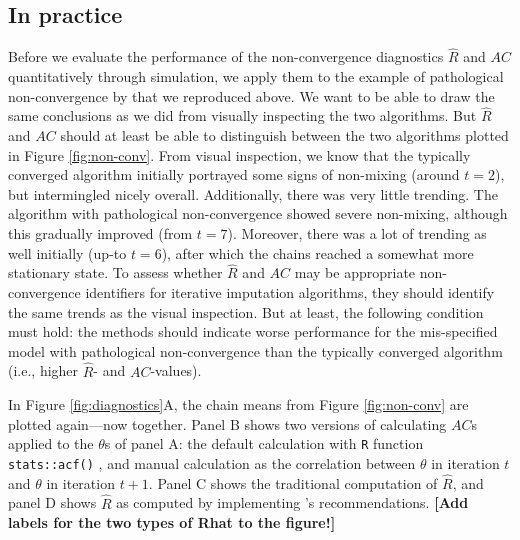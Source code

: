 \documentclass[Royal,times,sageh]{sagej}
\begin{document}
\hypertarget{in-practice}{%
\subsection{In practice}\label{in-practice}}

Before we evaluate the performance of the non-convergence diagnostics \(\widehat{R}\) and \(AC\) quantitatively through simulation, we apply them to the example of pathological non-convergence by \citet{buur18} that we reproduced above. We want to be able to draw the same conclusions as we did from visually inspecting the two algorithms. But \(\widehat{R}\) and \(AC\) should at least be able to distinguish between the two algorithms plotted in Figure \ref{fig:non-conv}. From visual inspection, we know that the typically converged algorithm initially portrayed some signs of non-mixing (around \(t=2\)), but intermingled nicely overall. Additionally, there was very little trending. The algorithm with pathological non-convergence showed severe non-mixing, although this gradually improved (from \(t=7\)). Moreover, there was a lot of trending as well initially (up-to \(t=6\)), after which the chains reached a somewhat more stationary state. To assess whether \(\widehat{R}\) and \(AC\) may be appropriate non-convergence identifiers for iterative imputation algorithms, they should identify the same trends as the visual inspection. But at least, the following condition must hold: the methods should indicate worse performance for the mis-specified model with pathological non-convergence than the typically converged algorithm (i.e., higher \(\widehat{R}\)- and \(AC\)-values).

In Figure \ref{fig:diagnostics}A, the chain means from Figure \ref{fig:non-conv} are plotted again---now together. Panel B shows two versions of calculating \(AC\)s applied to the \(\theta\)s of panel A: the default calculation with \texttt{R} function \texttt{stats::acf()} \citep{R}, and manual calculation as the correlation between \(\theta\) in iteration \(t\) and \(\theta\) in iteration \(t+1\). Panel C shows the traditional computation of \(\widehat{R}\), and panel D shows \(\widehat{R}\) as computed by implementing \citet{veht19} 's recommendations. \textbf{{[}Add labels for the two types of Rhat to the figure!{]}}
\end{document}
